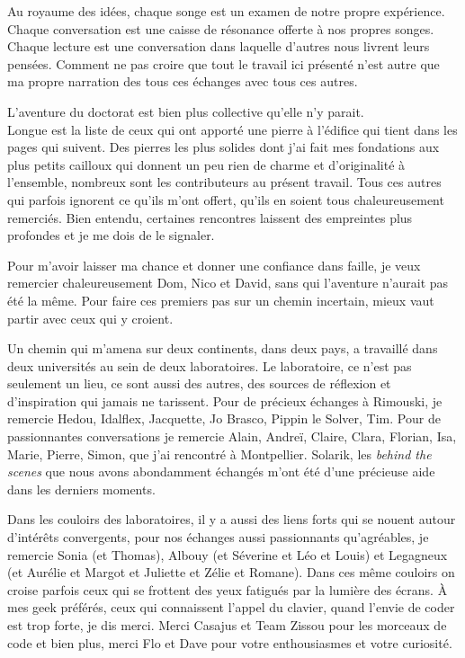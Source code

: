 Au royaume des idées, chaque songe est un examen de notre propre
expérience. Chaque conversation est une caisse de résonance offerte à
nos propres songes. Chaque lecture est une conversation dans laquelle
d'autres nous livrent leurs pensées. Comment ne pas croire que tout le
travail ici présenté n'est autre que ma propre narration des tous ces
échanges avec tous ces autres.

L'aventure du doctorat est bien plus collective qu'elle n'y parait.\\
Longue est la liste de ceux qui ont apporté une pierre à l'édifice qui
tient dans les pages qui suivent. Des pierres les plus solides dont j'ai
fait mes fondations aux plus petits cailloux qui donnent un peu rien de
charme et d'originalité à l'ensemble, nombreux sont les contributeurs au
présent travail. Tous ces autres qui parfois ignorent ce qu'ils m'ont
offert, qu'ils en soient tous chaleureusement remerciés. Bien entendu,
certaines rencontres laissent des empreintes plus profondes et je me
dois de le signaler.

Pour m'avoir laisser ma chance et donner une confiance dans faille, je
veux remercier chaleureusement Dom, Nico et David, sans qui l'aventure
n'aurait pas été la même. Pour faire ces premiers pas sur un chemin
incertain, mieux vaut partir avec ceux qui y croient.

Un chemin qui m'amena sur deux continents, dans deux pays, a travaillé
dans deux universités au sein de deux laboratoires. Le laboratoire, ce
n'est pas seulement un lieu, ce sont aussi des autres, des sources de
réflexion et d'inspiration qui jamais ne tarissent. Pour de précieux
échanges à Rimouski, je remercie Hedou, Idalflex, Jacquette, Jo Brasco,
Pippin le Solver, Tim. Pour de passionnantes conversations je remercie
Alain, Andreï, Claire, Clara, Florian, Isa, Marie, Pierre, Simon, que
j'ai rencontré à Montpellier. Solarik, les \emph{behind the scenes} que
nous avons abondamment échangés m'ont été d'une précieuse aide dans les
derniers moments.

Dans les couloirs des laboratoires, il y a aussi des liens forts qui se
nouent autour d'intérêts convergents, pour nos échanges aussi
passionnants qu'agréables, je remercie Sonia (et Thomas), Albouy (et
Séverine et Léo et Louis) et Legagneux (et Aurélie et Margot et Juliette
et Zélie et Romane). Dans ces même couloirs on croise parfois ceux qui
se frottent des yeux fatigués par la lumière des écrans. À mes geek
préférés, ceux qui connaissent l'appel du clavier, quand l'envie de
coder est trop forte, je dis merci. Merci Casajus et Team Zissou pour
les morceaux de code et bien plus, merci Flo et Dave pour votre
enthousiasmes et votre curiosité.

